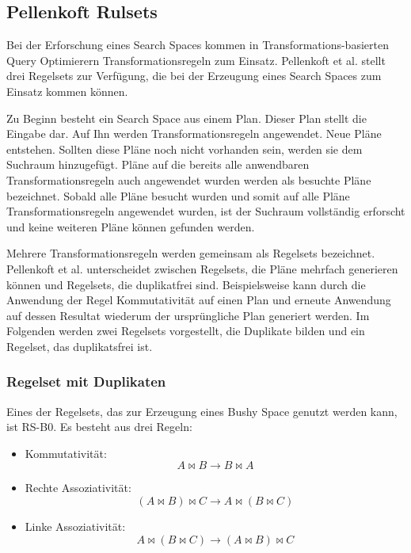 \subsection{Pellenkoft Rulsets}

Bei der Erforschung eines Search Spaces kommen in Transformations-basierten Query Optimierern Transformationsregeln zum Einsatz. Pellenkoft et al. \cite{pellenkoft1997duplicate} \cite{manegold2000multi} \cite{pellenkoft1997complexity} stellt drei Regelsets zur Verfügung, die bei der Erzeugung eines Search Spaces zum Einsatz kommen können.

Zu Beginn besteht ein Search Space aus einem Plan. Dieser Plan stellt die Eingabe dar. Auf Ihn werden Transformationsregeln angewendet. Neue Pläne entstehen. Sollten diese Pläne noch nicht vorhanden sein, werden sie dem Suchraum hinzugefügt. Pläne auf die bereits alle anwendbaren Transformationsregeln auch angewendet wurden werden als besuchte Pläne bezeichnet. Sobald alle Pläne besucht wurden und somit auf alle Pläne Transformationsregeln angewendet wurden, ist der Suchraum vollständig erforscht und keine weiteren Pläne können gefunden werden. 

Mehrere Transformationsregeln werden gemeinsam als Regelsets bezeichnet. Pellenkoft et al. unterscheidet zwischen Regelsets, die Pläne mehrfach generieren können und Regelsets, die duplikatfrei sind. Beispielsweise kann durch die Anwendung der Regel Kommutativität auf einen Plan und erneute Anwendung auf dessen Resultat wiederum der ursprüngliche Plan generiert werden. Im Folgenden werden zwei Regelsets vorgestellt, die Duplikate bilden und ein Regelset, das duplikatsfrei ist.


\subsubsection{Regelset mit Duplikaten}

Eines der Regelsets, das zur Erzeugung eines Bushy Space genutzt werden kann, ist RS-B0. Es besteht aus drei Regeln:

\begin{itemize}
\item Kommutativität: $$ A \Join B \to B \Join A$$
\item Rechte Assoziativität: $$(A \Join B) \Join C \to A \Join (B \Join C) $$
\item Linke Assoziativität: $$A \Join (B \Join C) \to (A \Join B) \Join C$$
\end{itemize}

